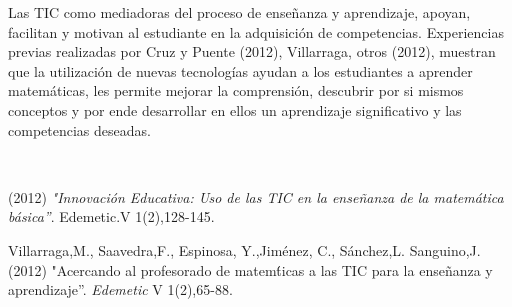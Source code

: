\begin{titlepage}
\begin{minipage}{0.85\linewidth}
\begin{minipage}{0.85\linewidth}
\begin{resumen}
Las TIC como mediadoras del proceso de ense\~nanza y aprendizaje, apoyan, facilitan y motivan al estudiante en la adquisici\'{o}n de competencias. Experiencias previas realizadas por Cruz y Puente (2012), Villarraga, otros (2012), muestran que la utilizaci\'{o}n de nuevas tecnolog\'{i}as ayudan a los estudiantes a aprender matem\'{a}ticas, les permite mejorar la comprensi\'{o}n, descubrir por si mismos conceptos y por ende desarrollar en ellos un aprendizaje significativo y las competencias deseadas.
    \end{resumen}
\end{minipage}
\vspace*{5pt}\\
\footnotesize
%  
    
\end{minipage}
\vspace{5pt}
\begin{thebibliography}{99}
 (2012) {\it "Innovaci\'{o}n Educativa: Uso de las TIC en la ense\~nanza de la matem\'{a}tica b\'{a}sica''}.  Edemetic.V 1(2),128-145.

 {\sc Villarraga,M., Saavedra,F., Espinosa, Y.,Jim\'{e}nez, C., S\'{a}nchez,L. Sanguino,J.} (2012) "Acercando al profesorado de matem\'ticas a las TIC para la ense\~nanza y aprendizaje''. \emph{Edemetic} V 1(2),65-88.
\end{thebibliography}
\end{titlepage}

